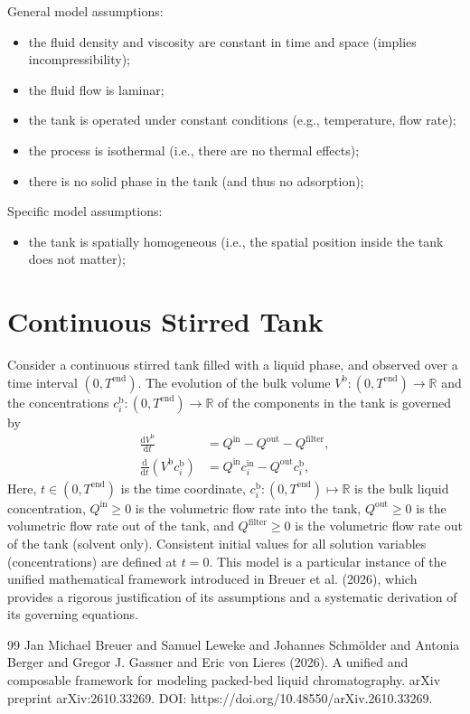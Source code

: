 \documentclass{article}
\begin{document}
General model assumptions:
\begin{itemize}
    \item the fluid density and viscosity are constant in time and space (implies incompressibility);
    \item the fluid flow is laminar;
    \item the tank is operated under constant conditions (e.g., temperature, flow rate);
    \item the process is isothermal (i.e., there are no thermal effects);
    \item there is no solid phase in the tank (and thus no adsorption);
\end{itemize}

Specific model assumptions:
\begin{itemize}
    \item the tank is spatially homogeneous (i.e., the spatial position inside the tank does not matter);
\end{itemize}

\section*{Continuous Stirred Tank}
Consider a continuous stirred tank filled with a liquid phase, and observed over a time interval $(0, T^{\mathrm{end}})$.
The evolution of the bulk volume $V^{\mathrm{b}}\colon (0, T^{\mathrm{end}}) \to \mathbb{R}$ and the concentrations $c^{\mathrm{b}}_{i}\colon (0, T^{\mathrm{end}}) \to \mathbb{R}$ of the components in the tank is governed by
\begin{align}
    \frac{\mathrm{d}V^{\mathrm{b}}}{\mathrm{d}t}
    &= Q^{\mathrm{in}}
        - Q^{\mathrm{out}}
        - Q^{\mathrm{filter}},
    \\
    \frac{\mathrm{d}}{\mathrm{d} t} \left( V^{\mathrm{b}} c^{\mathrm{b}}_{i} \right)
    &= Q^{\mathrm{in}} c^{\mathrm{in}}_{i}
        - Q^{\mathrm{out}} c^{\mathrm{b}}_{i},
\end{align}
Here, $t\in (0, T^{\mathrm{end}})$ is the time coordinate, $c^{\mathrm{b}}_{i}\colon (0, T^{\mathrm{end}}) \mapsto \mathbb{R}$ is the bulk liquid concentration, $Q^{\mathrm{in}}\geq 0$ is the volumetric flow rate into the tank, $Q^{\mathrm{out}}\geq 0$ is the volumetric flow rate out of the tank, and $Q^{\mathrm{filter}}\geq 0$ is the volumetric flow rate out of the tank (solvent only).
Consistent initial values for all solution variables (concentrations) are defined at $t = 0$.
This model is a particular instance of the unified mathematical framework introduced in Breuer et al. (2026), which provides a rigorous justification of its assumptions and a systematic derivation of its governing equations.
\begin{thebibliography}{99}
     Jan Michael Breuer and Samuel Leweke and Johannes Schmölder and Antonia Berger and Gregor J. Gassner and Eric von Lieres (2026). A unified and composable framework for modeling packed-bed liquid chromatography. arXiv preprint arXiv:2610.33269. DOI: https://doi.org/10.48550/arXiv.2610.33269.
\end{thebibliography}
\end{document}
